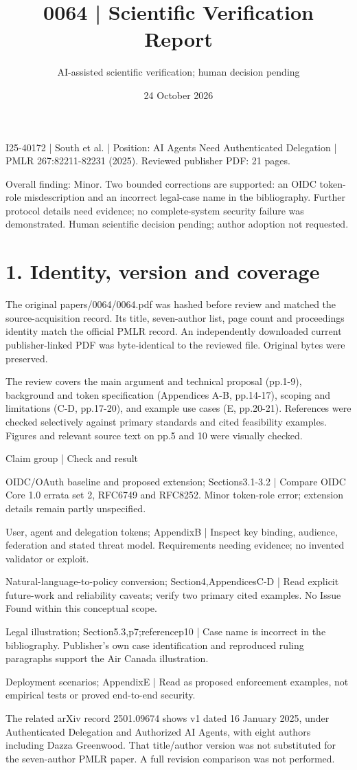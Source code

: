 \documentclass[10pt]{article}
\title{0064 | Scientific Verification Report}
\author{AI-assisted scientific verification; human decision pending}
\date{24 October 2026}
\begin{document}
\maketitle
I25-40172 | South et al. | Position: AI Agents Need Authenticated Delegation | PMLR 267:82211-82231 (2025). Reviewed publisher PDF: 21 pages.\par
Overall finding: Minor. Two bounded corrections are supported: an OIDC token-role misdescription and an incorrect legal-case name in the bibliography. Further protocol details need evidence; no complete-system security failure was demonstrated. Human scientific decision pending; author adoption not requested.\par
\section*{1. Identity, version and coverage}
The original papers/0064/0064.pdf was hashed before review and matched the source-acquisition record. Its title, seven-author list, page count and proceedings identity match the official PMLR record. An independently downloaded current publisher-linked PDF was byte-identical to the reviewed file. Original bytes were preserved.\par
The review covers the main argument and technical proposal (pp.1-9), background and token specification (Appendices A-B, pp.14-17), scoping and limitations (C-D, pp.17-20), and example use cases (E, pp.20-21). References were checked selectively against primary standards and cited feasibility examples. Figures and relevant source text on pp.5 and 10 were visually checked.\par
Claim group | Check and result\par
OIDC/OAuth baseline and proposed extension; Sections3.1-3.2 | Compare OIDC Core 1.0 errata set 2, RFC6749 and RFC8252. Minor token-role error; extension details remain partly unspecified.\par
User, agent and delegation tokens; AppendixB | Inspect key binding, audience, federation and stated threat model. Requirements needing evidence; no invented validator or exploit.\par
Natural-language-to-policy conversion; Section4,AppendicesC-D | Read explicit future-work and reliability caveats; verify two primary cited examples. No Issue Found within this conceptual scope.\par
Legal illustration; Section5.3,p7;referencep10 | Case name is incorrect in the bibliography. Publisher’s own case identification and reproduced ruling paragraphs support the Air Canada illustration.\par
Deployment scenarios; AppendixE | Read as proposed enforcement examples, not empirical tests or proved end-to-end security.\par
The related arXiv record 2501.09674 shows v1 dated 16 January 2025, under Authenticated Delegation and Authorized AI Agents, with eight authors including Dazza Greenwood. That title/author version was not substituted for the seven-author PMLR paper. A full revision comparison was not performed.\par
\end{document}
